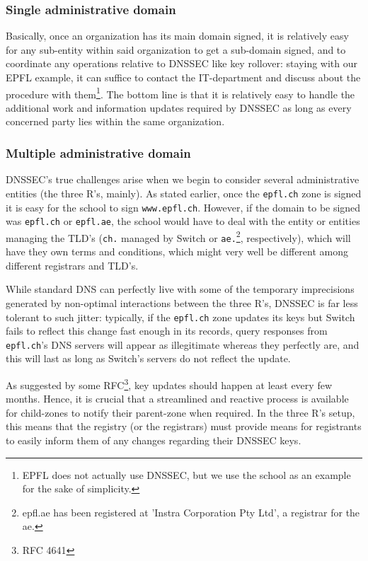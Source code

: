 \documentclass[a4paper,twocolumn]{scrartcl}
\begin{document}
\subsubsection{Single administrative domain}
Basically, once an organization has its main domain signed, it is relatively easy for any sub-entity within said organization to get a sub-domain signed, and to coordinate any operations relative to DNSSEC like key rollover: staying with our EPFL example, it can suffice to contact the IT-department and discuss about the procedure with them\footnote{EPFL does not actually use DNSSEC, but we use the school as an example for the sake of simplicity.}. The bottom line is that it is relatively easy to handle the additional work and information updates required by DNSSEC as long as every concerned party lies within the same organization.
\subsubsection{Multiple administrative domain}
DNSSEC's true challenges arise when we begin to consider several administrative entities (the three R's, mainly). As stated earlier, once the \verb|epfl.ch| zone is signed it is easy for the school to sign \verb|www.epfl.ch|. However, if the domain to be signed was \verb|epfl.ch| or \verb|epfl.ae|, the school would have to deal with the entity or entities managing the TLD's (\verb|ch.| managed by Switch or \verb|ae.|\footnote{epfl.ae has been registered at 'Instra Corporation Pty Ltd', a registrar for the ae.}, respectively), which will have they own terms and conditions, which might very well be different among different registrars and TLD's. 	

While standard DNS can perfectly live with some of the temporary imprecisions generated by non-optimal interactions between the three R's, DNSSEC is far less tolerant to such jitter: typically, if the \verb|epfl.ch| zone updates its keys but Switch fails to reflect this change fast enough in its records, query responses from \verb|epfl.ch|'s DNS servers will appear as illegitimate whereas they perfectly are, and this will last as long as Switch's servers do not reflect the update.

As suggested by some RFC\footnote{RFC 4641}, key updates should  happen at least every few months. Hence, it is crucial that a streamlined and reactive process is available for child-zones to notify their parent-zone when required. In the three R's setup, this means that the registry (or the registrars) must provide means for registrants to easily inform them of any changes regarding their DNSSEC keys.
\end{document}
